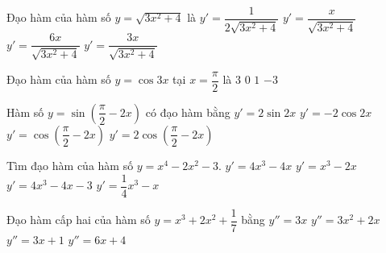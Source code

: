 \begin{ex}%
	Đạo  hàm của hàm số $y=\sqrt{3x^2+4}$ là
	\choice 
		{$y'=\dfrac{1}{2\sqrt{3x^2+4}}$} 
		{$y'=\dfrac{x}{\sqrt{3x^2+4}}$} 
		{$y'=\dfrac{6x}{\sqrt{3x^2+4}}$} 
		 {\True $y'=\dfrac{3x}{\sqrt{3x^2+4}}$}
\end{ex}

\begin{ex}%
	Đạo hàm của hàm số $y=\cos 3 x$  tại $x=\dfrac{\pi}{2}$ là
	 \choice
		{\True  $3$}
		 {$0$}
		{$1$} 
		{$-3$} 
\end{ex}

\begin{ex}%
	Hàm số $y = \sin \left( {\dfrac{\pi }{2}  - 2x} \right)$ có đạo hàm bằng \vspace{3pt}
	\choice 
		{$y' = 2\sin  2x$}
		{\True $y'  = - 2\cos 2x$}
		{$y' = \cos \left( {\dfrac{\pi  }{2} - 2x} \right)$}
		{$y' = 2\cos \left( {\dfrac{\pi }{2} - 2x} \right)$} 
\end{ex}

\begin{ex}%
	Tìm đạo  hàm của hàm số $y=x^4-2x^2-3$.
	 \choice
		 {\True $y'=4x^3-4x$}
		{$y'=x^3-2x$} 
		{$y'=4x^3-4x-3$} 
		{$y'=\dfrac{1}{4}x^3-x$} 
\end{ex}

\begin{ex}%
	Đạo hàm cấp hai  của hàm số $y=x^3+2x^2+\dfrac{1}{7}$ bằng
	 \choice
		 {$y''=3x$}
		{$y''=3x^2+2x$} 
		{$y''=3x+1$} 
		{\True $y''=6x+4$} 
\end{ex}

